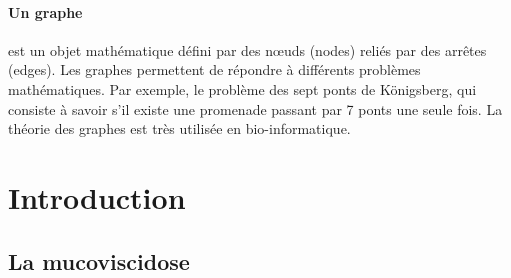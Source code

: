 \documentclass[12pt,a4paper]{article}
\begin{document}
\paragraph{Un graphe} est un objet mathématique défini par des nœuds (nodes) reliés par des arrêtes (edges). Les graphes permettent de répondre à différents problèmes mathématiques. Par exemple, le problème des sept ponts de Königsberg, qui consiste à savoir s'il existe une promenade passant par 7 ponts une seule fois. La théorie des graphes est très utilisée en bio-informatique.

\newpage

\setcounter{page}{1}

\section{Introduction}
\subsection{La mucoviscidose}
\end{document}
